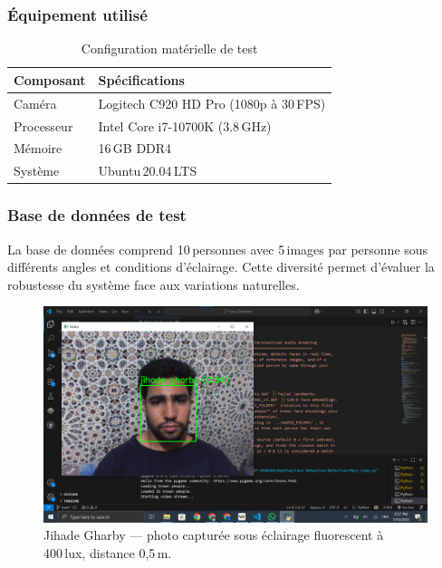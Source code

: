 \documentclass[12pt,a4paper]{article}
\begin{document}
\subsubsection{Équipement utilisé}
\begin{table}[H]
  \centering
  \begin{tabular}{@{}ll@{}}
    \toprule
    \textbf{Composant} & \textbf{Spécifications} \\
    \midrule
    Caméra     & Logitech C920 HD Pro (1080p à 30 FPS) \\
    Processeur & Intel Core i7-10700K (3.8 GHz) \\
    Mémoire    & 16 GB DDR4 \\
    Système    & Ubuntu 20.04 LTS \\
    \bottomrule
  \end{tabular}
  \caption{Configuration matérielle de test}
  \label{tab:hardware}
\end{table}

\subsubsection{Base de données de test}
La base de données comprend 10 personnes avec 5 images par personne sous différents angles et conditions d'éclairage. Cette diversité permet d'évaluer la robustesse du système face aux variations naturelles.

\begin{figure}[H]
  \centering
  \includegraphics[width=\textwidth]{Jihade_GHARBY.png}
  \caption{Jihade Gharby — photo capturée sous éclairage fluorescent à 400 lux, distance 0,5 m.}
  \label{fig:jihade}
\end{figure}
\end{document}
